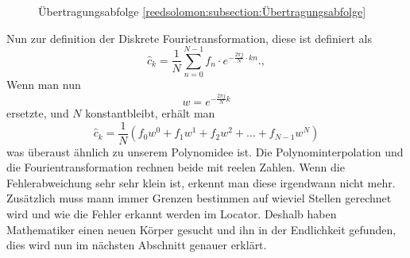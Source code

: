 \begin{figure}
	\centering
	\caption{Übertragungsabfolge \ref{reedsolomon:subsection:Übertragungsabfolge}}
	\label{fig:sendorder}
\end{figure}

Nun zur definition der Diskrete Fourietransformation, diese ist definiert als
\begin{equation}
	\hat{c}_{k} 
	= \frac{1}{N} \sum_{n=0}^{N-1}
	{f}_n \cdot e^{-\frac{2\pi j}{N} \cdot kn}.
	,\label{reedsolomon:DFT}
\end{equation}
Wenn man nun 
\begin{equation}
	w =
	e^{-\frac{2\pi j}{N} k}
	\label{reedsolomon:DFT_summand}
\end{equation}
ersetzte, und $N$ konstantbleibt, erhält man
\begin{equation}
	\hat{c}_{k}=
	\frac{1}{N}( {f}_0 w^0 + {f}_1 w^1 + {f}_2 w^2 + \dots + {f}_{N-1} w^N)
	\label{reedsolomon:DFT_polynom}
\end{equation}
was überaust ähnlich zu unserem Polynomidee ist.
Die Polynominterpolation und die Fourientransformation rechnen beide mit reelen Zahlen.
Wenn die Fehlerabweichung sehr sehr klein ist, erkennt man diese irgendwann nicht mehr.
Zusätzlich muss mann immer Grenzen bestimmen auf wieviel Stellen gerechnet wird und wie die Fehler erkannt werden im Locator.
Deshalb haben Mathematiker einen neuen Körper gesucht und ihn in der Endlichkeit gefunden,
dies wird nun im nächsten Abschnitt genauer erklärt.

